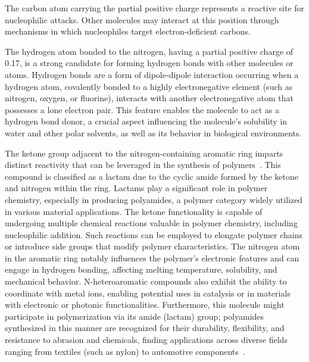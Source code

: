 The carbon atom carrying the partial positive charge represents a reactive site for nucleophilic attacks. Other molecules may interact at this position through mechanisms in which nucleophiles target electron-deficient carbons.

The hydrogen atom bonded to the nitrogen, having a partial positive charge of 0.17, is a strong candidate for forming hydrogen bonds with other molecules or atoms. Hydrogen bonds are a form of dipole-dipole interaction occurring when a hydrogen atom, covalently bonded to a highly electronegative element (such as nitrogen, oxygen, or fluorine), interacts with another electronegative atom that possesses a lone electron pair. This feature enables the molecule to act as a hydrogen bond donor, a crucial aspect influencing the molecule’s solubility in water and other polar solvents, as well as its behavior in biological environments.

The ketone group adjacent to the nitrogen-containing aromatic ring imparts distinct reactivity that can be leveraged in the synthesis of polymers~\cite{McQuarrieSimonPhysicalChemistry,CareySundbergAdvancedOrganicChemistry,Varghese2022BeyondApplications,Varghese2022BeyondApplications}. This compound is classified as a lactam due to the cyclic amide formed by the ketone and nitrogen within the ring. Lactams play a significant role in polymer chemistry, especially in producing polyamides, a polymer category widely utilized in various material applications. The ketone functionality is capable of undergoing multiple chemical reactions valuable in polymer chemistry, including nucleophilic addition. Such reactions can be employed to elongate polymer chains or introduce side groups that modify polymer characteristics. The nitrogen atom in the aromatic ring notably influences the polymer's electronic features and can engage in hydrogen bonding, affecting melting temperature, solubility, and mechanical behavior. N-heteroaromatic compounds also exhibit the ability to coordinate with metal ions, enabling potential uses in catalysis or in materials with electronic or photonic functionalities. Furthermore, this molecule might participate in polymerization via its amide (lactam) group; polyamides synthesized in this manner are recognized for their durability, flexibility, and resistance to abrasion and chemicals, finding applications across diverse fields ranging from textiles (such as nylon) to automotive components~\cite{Varghese2022BeyondApplications,Varghese2022BeyondApplications}.

